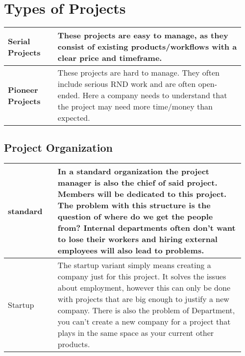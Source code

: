 \documentclass[main.tex,fontsize=8pt,paper=a4,paper=portrait,DIV=calc,]{scrartcl}
\begin{document}
\begin{table}[h!]
\section{Types of Projects}
\begin{tabular}{|m{0.205\linewidth}|m{0.75\linewidth}|}
\hline
\textbf{Serial Projects} & These projects are easy to manage, as they consist of existing products/workflows with a clear price and timeframe.\\
\hline
\textbf{Pioneer Projects} & These projects are hard to manage. They often include serious RND work and are often open-ended. Here a company needs to understand that the project may need more time/money than expected.\\
\end{tabular}
\subsection{Project Organization}
\begin{tabular}{|m{0.205\linewidth}|m{0.75\linewidth}|}
\hline
standard & In a standard organization the project manager is also the chief of said project. Members will be dedicated to this project.
The problem with this structure is the question of where do we get the people from? Internal departments often don't want to lose their workers and hiring external employees will also lead to problems.\\
\hline
Startup & The startup variant simply means creating a company just for this project. It solves the issues about employment, however this can only be done with projects that are big enough to justify a new company. \newline
There is also the problem of Department, you can't create a new company for a project that plays in the same space as your current other products.\\
\hline
\end{tabular}
\end{table}
\end{document}

